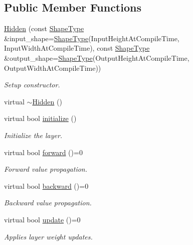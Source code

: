 \subsection*{Public Member Functions}
\begin{DoxyCompactItemize}
\item 
\hyperlink{classffnn_1_1layer_1_1_hidden_a9301e592926285c2960d0fe7543554c0}{Hidden} (const \hyperlink{classffnn_1_1layer_1_1_hidden_a7ed1a797fcb7bfb43d66c0eb24967882}{Shape\-Type} \&input\-\_\-shape=\hyperlink{classffnn_1_1layer_1_1_hidden_a7ed1a797fcb7bfb43d66c0eb24967882}{Shape\-Type}(Input\-Height\-At\-Compile\-Time, Input\-Width\-At\-Compile\-Time), const \hyperlink{classffnn_1_1layer_1_1_hidden_a7ed1a797fcb7bfb43d66c0eb24967882}{Shape\-Type} \&output\-\_\-shape=\hyperlink{classffnn_1_1layer_1_1_hidden_a7ed1a797fcb7bfb43d66c0eb24967882}{Shape\-Type}(Output\-Height\-At\-Compile\-Time, Output\-Width\-At\-Compile\-Time))
\begin{DoxyCompactList}\small\item\em Setup constructor. \end{DoxyCompactList}\item 
virtual \hyperlink{classffnn_1_1layer_1_1_hidden_a28d2c1175388ed7e9126b7e0ddd45e14}{$\sim$\-Hidden} ()
\item 
virtual bool \hyperlink{classffnn_1_1layer_1_1_hidden_a3b5458a771fcf2371376049d85afbc92}{initialize} ()
\begin{DoxyCompactList}\small\item\em Initialize the layer. \end{DoxyCompactList}\item 
virtual bool \hyperlink{classffnn_1_1layer_1_1_hidden_a41fdfb60b5340c0af46c7c731237e280}{forward} ()=0
\begin{DoxyCompactList}\small\item\em Forward value propagation. \end{DoxyCompactList}\item 
virtual bool \hyperlink{classffnn_1_1layer_1_1_hidden_a246152dfed00bbacb94fbbd6712acea0}{backward} ()=0
\begin{DoxyCompactList}\small\item\em Backward value propagation. \end{DoxyCompactList}\item 
virtual bool \hyperlink{classffnn_1_1layer_1_1_hidden_ace039624b0b202413e068fd523f26884}{update} ()=0
\begin{DoxyCompactList}\small\item\em Applies layer weight updates. \end{DoxyCompactList}\end{DoxyCompactItemize}
